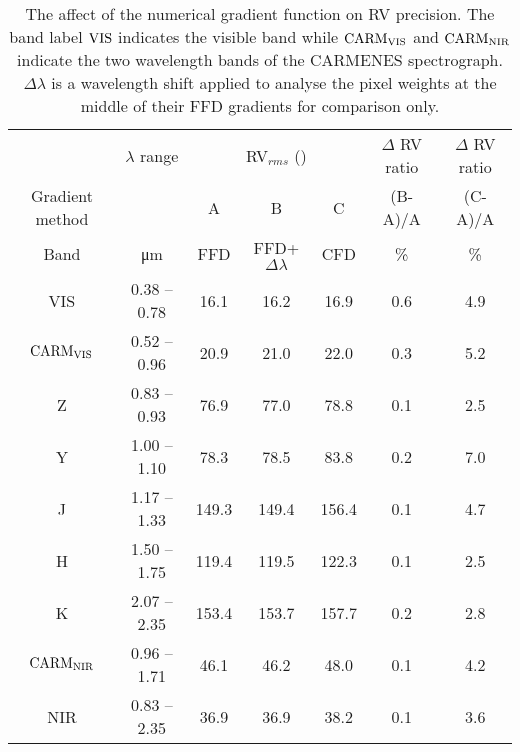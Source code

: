 
\begin{table}
    \caption{The affect of the numerical gradient function on RV precision. The band label \(\rm VIS\) indicates the visible band while  \(\rm CARM_{VIS}\)  and \(\rm CARM_{NIR}\)  indicate the two wavelength bands of the CARMENES spectrograph. \(\Delta\lambda\) is a wavelength shift applied to analyse the pixel weights at the middle of their FFD gradients for comparison only.}
    \begin{tabular}{ccccccc}
        \toprule
  &   $\lambda$ range & \multicolumn{3}{c}{RV\(_{rms}\) (\mps{})} & \(\Delta\) RV ratio& \(\Delta\) RV ratio\\
 Gradient method&  &  A &   B & C & (B-A)/A & (C-A)/A \\
 Band  &  \si{\micro\meter} & FFD & FFD+\(\Delta\lambda\) &  CFD &  \% & \% \\
    \midrule
VIS & 0.38 -- 0.78 & 16.1 & 16.2 & 16.9  & 0.6 & 4.9\\
\(\rm CARM_{VIS}\) & 0.52 --  0.96 & 20.9 & 21.0 & 22.0 & 0.3& 5.2 \\
Z & 0.83 -- 0.93 & 76.9 & 77.0 & 78.8  & 0.1 & 2.5\\
Y & 1.00 -- 1.10 & 78.3 & 78.5 & 83.8 & 0.2 & 7.0 \\
J & 1.17 -- 1.33 & 149.3 & 149.4 & 156.4 & 0.1 & 4.7 \\
H & 1.50 -- 1.75 & 119.4 & 119.5 & 122.3 & 0.1 & 2.5 \\
K & 2.07 -- 2.35 & 153.4 & 153.7 & 157.7  & 0.2 & 2.8\\
\(\rm CARM_{NIR}\) & 0.96 -- 1.71 & 46.1 & 46.2 & 48.0 & 0.1& 4.2 \\
NIR & 0.83 -- 2.35 & 36.9 & 36.9 & 38.2 & 0.1 & 3.6  \\
    \bottomrule
    \end{tabular}\label{tab:numerical_gradients}
\end{table}
